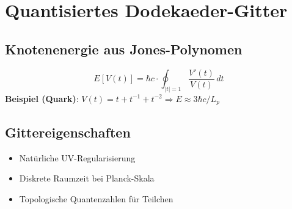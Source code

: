 \section{Quantisiertes Dodekaeder-Gitter}
\subsection{Knotenenergie aus Jones-Polynomen}
\[
E[V(t)] = \hbar c \cdot \oint_{|t|=1} \frac{V'(t)}{V(t)} \, dt
\]
\textbf{Beispiel (Quark)}: $V(t) = t + t^{-1} + t^{-2} \Rightarrow E \approx 3\hbar c/L_p$

\subsection{Gittereigenschaften}
\begin{itemize}
\item Natürliche UV-Regularisierung
\item Diskrete Raumzeit bei Planck-Skala
\item Topologische Quantenzahlen für Teilchen
\end{itemize}